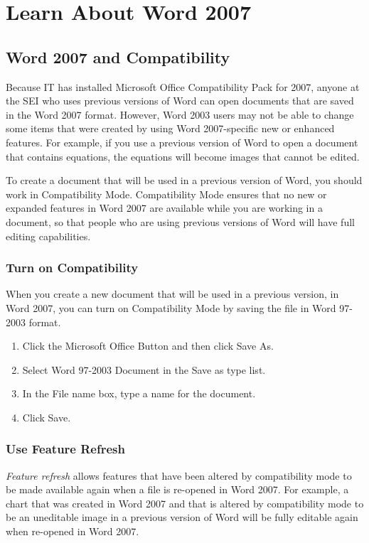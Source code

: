 \chapter{Learn About Word 2007}\label{ch:learnword}

\section{Word 2007 and Compatibility}
Because IT has installed Microsoft Office Compatibility Pack for 2007, anyone at the SEI who uses previous versions of Word can open documents that are saved in the Word 2007 format. However, Word 2003 users may not be able to change some items that were created by using Word 2007-specific new or enhanced features. For example, if you use a previous version of Word to open a document that contains equations, the equations will become images that cannot be edited.

To create a document that will be used in a previous version of Word, you should work in Compatibility Mode. Compatibility Mode ensures that no new or expanded features in Word 2007 are available while you are working in a document, so that people who are using previous versions of Word will have full editing capabilities.

\subsection{Turn on Compatibility}
When you create a new document that will be used in a previous version, in Word 2007, you can turn on Compatibility Mode by saving the file in Word 97-2003 format.
\begin{enumerate}
\item Click the Microsoft Office Button and then click Save As. 
\item Select Word 97-2003 Document in the Save as type list. 
\item In the File name box, type a name for the document. 
\item Click Save.
\end{enumerate}

\subsection{Use Feature Refresh}
\textit{Feature refresh} allows features that have been altered by compatibility mode to be made available again when a file is re-opened in Word 2007. For example, a chart that was created in Word 2007 and that is altered by compatibility mode to be an uneditable image in a previous version of Word will be fully editable again when re-opened in Word 2007.

